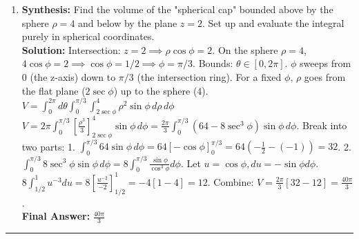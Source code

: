 \documentclass[11pt]{article}
\begin{document}
\begin{enumerate}[label=\textbf{\arabic*.}]
\item \textbf{Synthesis:} Find the volume of the "spherical cap" bounded above by the sphere $\rho=4$ and below by the plane $z=2$. Set up and evaluate the integral purely in spherical coordinates.\\
\textbf{Solution:}
Intersection: $z=2 \implies \rho\cos\phi=2$. On the sphere $\rho=4$, $4\cos\phi=2 \implies \cos\phi=1/2 \implies \phi=\pi/3$.
Bounds: $\theta \in [0, 2\pi]$. $\phi$ sweeps from $0$ (the z-axis) down to $\pi/3$ (the intersection ring). For a fixed $\phi$, $\rho$ goes from the flat plane ($2\sec\phi$) up to the sphere (4).
$V = \int_0^{2\pi} d\theta \int_0^{\pi/3} \int_{2\sec\phi}^4 \rho^2\sin\phi \,d\rho \,d\phi$
$V = 2\pi \int_0^{\pi/3} [\frac{\rho^3}{3}]_{2\sec\phi}^4 \sin\phi \,d\phi = \frac{2\pi}{3} \int_0^{\pi/3} (64 - 8\sec^3\phi)\sin\phi \,d\phi$.
Break into two parts:
1. $\int_0^{\pi/3} 64\sin\phi \,d\phi = 64[-\cos\phi]_0^{\pi/3} = 64(-\frac{1}{2} - (-1)) = 32$.
2. $\int_0^{\pi/3} 8\sec^3\phi\sin\phi \,d\phi = 8 \int_0^{\pi/3} \frac{\sin\phi}{\cos^3\phi} d\phi$. Let $u=\cos\phi, du=-\sin\phi d\phi$.
$8 \int_{1/2}^1 u^{-3} du = 8 [\frac{u^{-2}}{-2}]_{1/2}^1 = -4 [1 - 4] = 12$.
Combine: $V = \frac{2\pi}{3} [32 - 12] = \frac{40\pi}{3}$.\\
\textbf{Final Answer:} $\frac{40\pi}{3}$

\end{enumerate}

\vspace{1cm}
\hrule \vspace{0.5cm}
\end{document}
